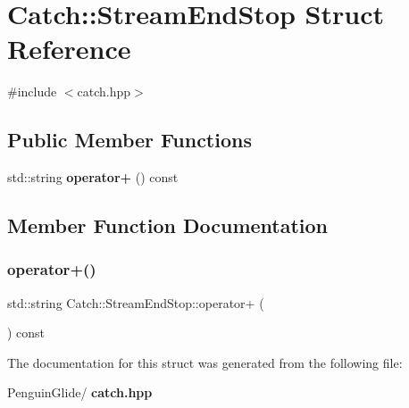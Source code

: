 \section{Catch\+::Stream\+End\+Stop Struct Reference}
\label{struct_catch_1_1_stream_end_stop}


{\ttfamily \#include $<$catch.\+hpp$>$}

\subsection*{Public Member Functions}
\begin{DoxyCompactItemize}
\item 
std\+::string \textbf{ operator+} () const
\end{DoxyCompactItemize}


\subsection{Member Function Documentation}
\mbox{\label{struct_catch_1_1_stream_end_stop_a4a518f0342a381074821d5bda2651401}} 
\subsubsection{operator+()}
{\footnotesize\ttfamily std\+::string Catch\+::\+Stream\+End\+Stop\+::operator+ (\begin{DoxyParamCaption}{ }\end{DoxyParamCaption}) const}



The documentation for this struct was generated from the following file\+:\begin{DoxyCompactItemize}
\item 
Penguin\+Glide/\textbf{ catch.\+hpp}\end{DoxyCompactItemize}
